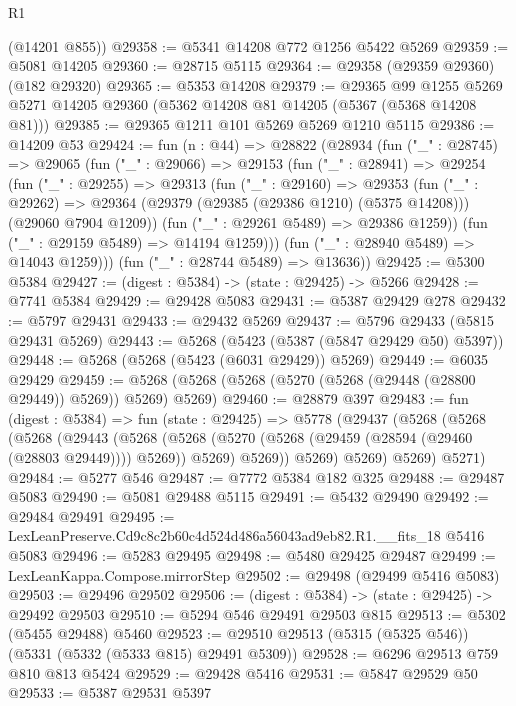 \begin{lexlean}{R1}
\begin{coremodule}
      (@14201 @855))
@29358 := @5341 @14208 @772 @1256 @5422 @5269
@29359 := @5081 @14205
@29360 := @28715 @5115
@29364 := @29358 (@29359 @29360) (@182 @29320)
@29365 := @5353 @14208
@29379 := @29365
    @99
    @1255
    @5269
    @5271
    @14205
    @29360
    (@5362 @14208 @81 @14205 (@5367 (@5368 @14208 @81)))
@29385 := @29365 @1211 @101 @5269 @5269 @1210 @5115
@29386 := @14209 @53
@29424 := fun (n : @44) =>
  @28822
    (@28934
      (fun ("_" : @28745) =>
      @29065
        (fun ("_" : @29066) =>
        @29153
          (fun ("_" : @28941) =>
          @29254
            (fun ("_" : @29255) =>
            @29313
              (fun ("_" : @29160) =>
              @29353
                (fun ("_" : @29262) =>
                @29364 (@29379 (@29385 (@29386 @1210) (@5375 @14208))) (@29060 @7904 @1209))
                (fun ("_" : @29261 @5489) => @29386 @1259))
              (fun ("_" : @29159 @5489) => @14194 @1259)))
          (fun ("_" : @28940 @5489) => @14043 @1259)))
      (fun ("_" : @28744 @5489) => @13636))
@29425 := @5300 @5384
@29427 := (digest : @5384) -> (state : @29425) -> @5266
@29428 := @7741 @5384
@29429 := @29428 @5083
@29431 := @5387 @29429 @278
@29432 := @5797 @29431
@29433 := @29432 @5269
@29437 := @5796 @29433 (@5815 @29431 @5269)
@29443 := @5268 (@5423 (@5387 (@5847 @29429 @50) @5397))
@29448 := @5268 (@5268 (@5423 (@6031 @29429)) @5269)
@29449 := @6035 @29429
@29459 := @5268 (@5268 (@5268 (@5270 (@5268 (@29448 (@28800 @29449)) @5269)) @5269) @5269)
@29460 := @28879 @397
@29483 := fun (digest : @5384) =>
  fun (state : @29425) =>
  @5778
    (@29437
      (@5268
        (@5268
          (@5268
            (@29443
              (@5268
                (@5268 (@5270 (@5268 (@29459 (@28594 (@29460 (@28803 @29449)))) @5269)) @5269)
                @5269))
            @5269)
          @5269)
        @5269)
      @5271)
@29484 := @5277 @546
@29487 := @7772 @5384 @182 @325
@29488 := @29487 @5083
@29490 := @5081 @29488 @5115
@29491 := @5432 @29490
@29492 := @29484 @29491
@29495 := LexLeanPreserve.Cd9c8c2b60c4d524d486a56043ad9eb82.R1.__fits_18 @5416 @5083
@29496 := @5283 @29495
@29498 := @5480 @29425 @29487
@29499 := LexLeanKappa.Compose.mirrorStep
@29502 := @29498 (@29499 @5416 @5083)
@29503 := @29496 @29502
@29506 := (digest : @5384) -> (state : @29425) -> @29492 @29503
@29510 := @5294 @546 @29491 @29503 @815
@29513 := @5302 (@5455 @29488) @5460
@29523 := @29510 @29513 (@5315 (@5325 @546)) (@5331 (@5332 (@5333 @815) @29491 @5309))
@29528 := @6296 @29513 @759 @810 @813 @5424
@29529 := @29428 @5416
@29531 := @5847 @29529 @50
@29533 := @5387 @29531 @5397

\end{coremodule}
\end{lexlean}
